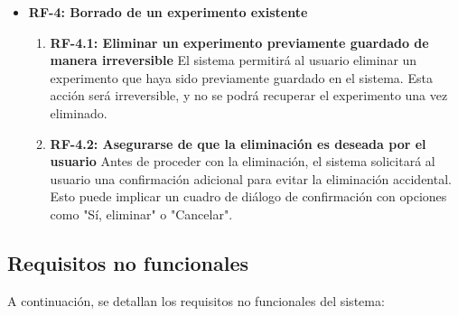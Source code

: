 \begin{itemize}
    \item \textbf{RF-4: Borrado de un experimento existente} 
    \begin{enumerate}
        \item \textbf{RF-4.1: Eliminar un experimento previamente guardado de manera irreversible} 
        El sistema permitirá al usuario eliminar un experimento que haya sido previamente guardado en el sistema. Esta acción será irreversible, y no se podrá recuperar el experimento una vez eliminado.
        \item \textbf{RF-4.2: Asegurarse de que la eliminación es deseada por el usuario} 
		Antes de proceder con la eliminación, el sistema solicitará al usuario una confirmación adicional para evitar la eliminación accidental. Esto puede implicar un cuadro de diálogo de confirmación con opciones como "Sí, eliminar" o "Cancelar".
    \end{enumerate}

\end{itemize}

\subsection{Requisitos no funcionales}

A continuación, se detallan los requisitos no funcionales del sistema:

